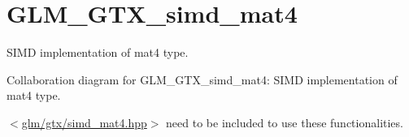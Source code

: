 \hypertarget{group__gtx__simd__mat4}{}\section{G\+L\+M\+\_\+\+G\+T\+X\+\_\+simd\+\_\+mat4}
\label{group__gtx__simd__mat4}


S\+I\+M\+D implementation of mat4 type.  


Collaboration diagram for G\+L\+M\+\_\+\+G\+T\+X\+\_\+simd\+\_\+mat4\+:
S\+I\+M\+D implementation of mat4 type. 

$<$\hyperlink{simd__mat4_8hpp_source}{glm/gtx/simd\+\_\+mat4.\+hpp}$>$ need to be included to use these functionalities. 